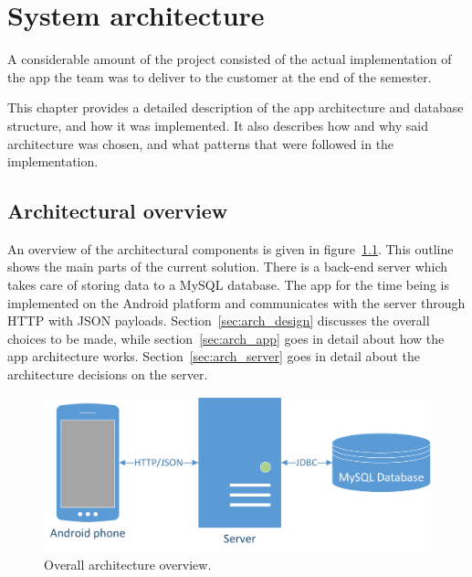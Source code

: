 \chapter{System architecture}

A considerable amount of the project consisted of the actual implementation of the app the team was to deliver to the customer at the end of the semester. 

This chapter provides a detailed description of the app architecture and database structure, and how it was implemented. It also describes how and why said architecture was chosen, and what patterns that were followed in the implementation. 

\section{Architectural overview}
An overview of the architectural components is given in figure~\ref{fig:architecture}. This outline shows the main parts of the current solution. There is a back-end server which takes care of storing data to a MySQL database. The app for the time being is implemented on the Android platform and communicates with the server through HTTP with JSON payloads. Section~\ref{sec:arch_design} discusses the overall choices to be made, while section~\ref{sec:arch_app} goes in detail about how the app architecture works. Section~\ref{sec:arch_server} goes in detail about the architecture decisions on the server.

\begin{figure}[H]
\includegraphics[width=\textwidth]{ch/architecture/fig/arch.png}
\caption{Overall architecture overview.}
\label{fig:architecture}
\end{figure}





